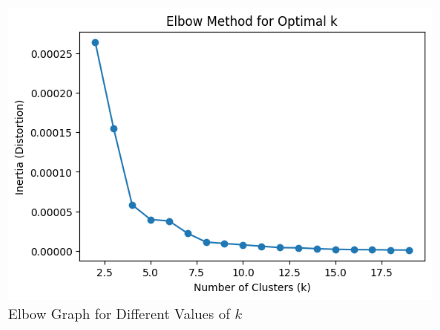\documentclass[conference]{IEEEtran}
\begin{document}
\begin{figure}[htbp]
    \centering
    \includegraphics[width=\columnwidth]{elbow_graph.png}
    \caption{Elbow Graph for Different Values of \(k\)}
    \label{fig:example}
\end{figure}
\end{document}
